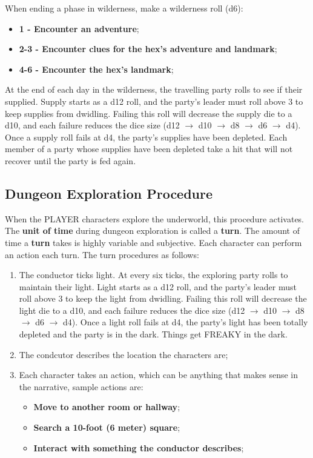 When ending a phase in wilderness, make a wilderness roll (d6):
\begin{itemize}
    \item {\textbf{1 - Encounter an adventure};}
    \item {\textbf{2-3 - Encounter clues for the hex's adventure and landmark};}
    \item {\textbf{4-6 - Encounter the hex's landmark};}
\end{itemize}
At the end of each day in the wilderness, the travelling party rolls to see if their supplied. Supply starts as a d12 roll, and the party's leader must roll above 3 to keep supplies from dwidling. Failing this roll will decrease the supply die to a d10, and each failure reduces the dice size (d12 $\rightarrow$ d10 $\rightarrow$ d8 $\rightarrow$ d6 $\rightarrow$ d4). Once a supply roll fails at d4, the party's supplies have been depleted. Each member of a party whose supplies have been depleted take a hit that will not recover until the party is fed again.

\subsection{Dungeon Exploration Procedure}
When the PLAYER characters explore the underworld, this procedure activates. The \textbf{unit of time} during dungeon exploration is called a \textbf{turn}. The amount of time a \textbf{turn} takes is highly variable and subjective. Each character can perform an action each turn. The turn procedures as follows:
\begin{enumerate}
    \item {The conductor ticks light. At every six ticks, the exploring party rolls to maintain their light. Light starts as a d12 roll, and the party's leader must roll above 3 to keep the light from dwidling. Failing this roll will decrease the light die to a d10, and each failure reduces the dice size (d12 $\rightarrow$ d10 $\rightarrow$ d8 $\rightarrow$ d6 $\rightarrow$ d4). Once a light roll fails at d4, the party's light has been totally depleted and the party is in the dark. Things get FREAKY in the dark.}
    \item {The condcutor describes the location the characters are;}
    \item {Each character takes an action, which can be anything that makes sense in the narrative, sample actions are:}
    \begin{itemize}
        \item {\textbf{Move to another room or hallway};}
        \item {\textbf{Search a 10-foot (6 meter) square};}
        \item {\textbf{Interact with something the conductor describes};}
    \end{itemize}
\end{enumerate}

